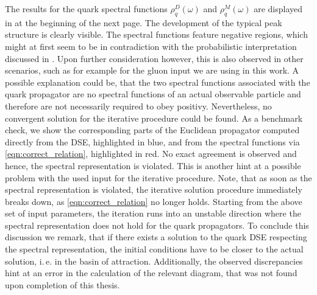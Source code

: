 The results for the quark spectral functions $\rho_q^D(\omega)$ and $\rho_q^M(\omega)$ are displayed in  at the beginning of the next page. The development of the typical peak structure is clearly visible. The spectral functions feature negative regions, which might at first seem to be in contradiction with the probabilistic interpretation discussed in . Upon further consideration however, this is also observed in other scenarios, such as for example for the gluon input we are using in this work. A possible explanation could be, that the two spectral functions associated with the quark propagator are no spectral functions of an actual observable particle and therefore are not necessarily required to obey positivy.  Nevertheless, no convergent solution for the iterative procedure could be found. As a benchmark check, we show the corresponding parts of the Euclidean propagator computed directly from the DSE, highlighted in blue, and from the spectral functions via \eqref{eqn:correct_relation}, highlighted in red. No exact agreement is observed and hence, the spectral representation is violated. This is another hint at a possible problem with the used input for the iterative procedure. Note, that as soon as the spectral representation is violated, the iterative solution procedure immediately breaks down, as \eqref{eqn:correct_relation} no longer holds. Starting from the above set of input parameters, the iteration runs into an unstable direction where the spectral representation does not hold for the quark propagators. To conclude this discussion we remark, that if there exists a solution to the quark DSE respecting the spectral representation, the initial conditions have to be closer to the actual solution, i.\,e. in the basin of attraction. Additionally, the observed discrepancies hint at an error in the calculation of the relevant diagram, that was not found  upon completion of this thesis. 
 
